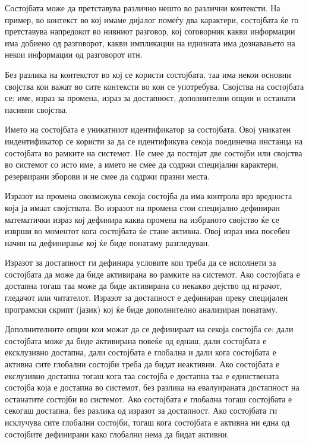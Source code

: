 Состојбата може да претставува различно нешто во различни контексти. На пример, во контекст во кој имаме дијалог помеѓу два карактери, состојбата ќе го претставува напредокот во нивниот разговор, кој соговорник какви информации има добиено од разговорот, какви импликации на иднината има дознавањето на некои информации од разговорот итн.

Без разлика на контекстот во кој се користи состојбата, таа има некои основни својства кои важат во сите контексти во кои се употребува. Својства на состојбата се: име, израз за промена, израз за достапност, дополнителни опции и останати пасивни својства.

Името на состојбата е уникатниот идентификатор за состојбата. Овој уникатен индентификатор се користи за да се идентификува секоја поединечна инстанца на состојбата во рамките на системот. Не смее да постојат две состојби или својства во системот со исто име, а името не смее да содржи специјални карактери, резервирани зборови и не смее да содржи празни места.

Изразот на промена овозможува секоја состојба да има контрола врз вредноста која ја имаат својствата. Во изразот на промена стои специјално дефиниран математички израз кој дефинира каква промена на избраното својство ќе се изврши во моментот кога состојбата ќе стане активна. Овој израз има посебен начин на дефинирање кој ќе биде понатаму разгледуван.

Изразот за достапност ги дефинира условите кои треба да се исполнети за состојбата да може да биде активирана во рамките на системот. Ако состојбата е достапна тогаш таа може да биде активирана со некакво дејство од играчот, гледачот или читателот. Изразот за достапност е дефиниран преку специјален програмски скрипт (јазик) кој ќе биде дополнително анализиран понатаму.

Дополнителните опции кои можат да се дефинираат на секоја состојба се: дали состојбата може да биде активирана повеќе од еднаш, дали состојбата е ексклузивно достапна, дали состојбата е глобална и дали кога состојбата е активна сите глобални состојби треба да бидат неактивни. Ако состојбата е екслузивно достапна тогаш кога таа состојба е достапна таа е единствената состојба која е достапна во системот, без разлика на евалуираната достапност на останатите состојби во системот. Ако состојбата е глобална тогаш состојбата е секогаш достапна, без разлика од изразот за достапност. Ако состојбата ги исклучува сите глобални состојби, тогаш кога состојбата е активна ни една од состојбите дефинирани како глобални нема да бидат активни.

